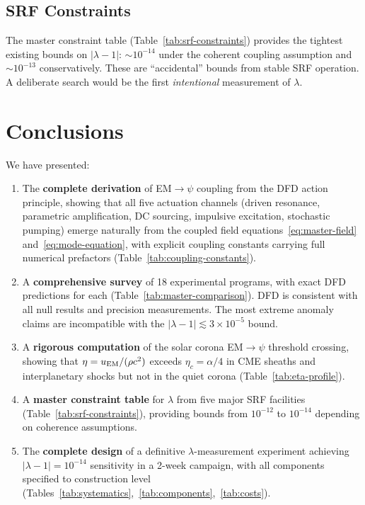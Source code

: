 \documentclass[aps,prd,twocolumn,superscriptaddress,floatfix,nofootinbib]{revtex4-2}
\newcommand{\lam}{\lambda}
\begin{document}
\subsection{SRF Constraints}

The master constraint table (Table~\ref{tab:srf-constraints}) provides
the tightest existing bounds on $|\lambda-1|$: $\sim 10^{-14}$ under
the coherent coupling assumption and $\sim 10^{-13}$ conservatively.
These are ``accidental'' bounds from stable SRF operation. A deliberate
search would be the first \emph{intentional} measurement of $\lambda$.


\section{Conclusions}\label{sec:conclusions}

We have presented:

\begin{enumerate}
\item The \textbf{complete derivation} of EM$\to\psi$ coupling from
the DFD action principle, showing that all five actuation channels
(driven resonance, parametric amplification, DC sourcing, impulsive
excitation, stochastic pumping) emerge naturally from the coupled
field equations~\eqref{eq:master-field} and~\eqref{eq:mode-equation},
with explicit coupling constants carrying full numerical prefactors
(Table~\ref{tab:coupling-constants}).

\item A \textbf{comprehensive survey} of 18 experimental programs,
with exact DFD predictions for each
(Table~\ref{tab:master-comparison}). DFD is consistent with all null
results and precision measurements. The most extreme anomaly claims
are incompatible with the $|\lam-1| \lesssim 3\times10^{-5}$ bound.

\item A \textbf{rigorous computation} of the solar corona EM$\to\psi$
threshold crossing, showing that $\eta = u_{\rm EM}/(\rho c^2)$
exceeds $\eta_c = \alpha/4$ in CME sheaths and interplanetary shocks
but not in the quiet corona (Table~\ref{tab:eta-profile}).

\item A \textbf{master constraint table} for $\lambda$ from five major
SRF facilities (Table~\ref{tab:srf-constraints}), providing bounds
from $10^{-12}$ to $10^{-14}$ depending on coherence assumptions.

\item The \textbf{complete design} of a definitive $\lambda$-measurement
experiment achieving $|\lam-1| = 10^{-14}$ sensitivity in a 2-week
campaign, with all components specified to construction level
(Tables~\ref{tab:systematics},~\ref{tab:components},~\ref{tab:costs}).
\end{enumerate}
\end{document}
